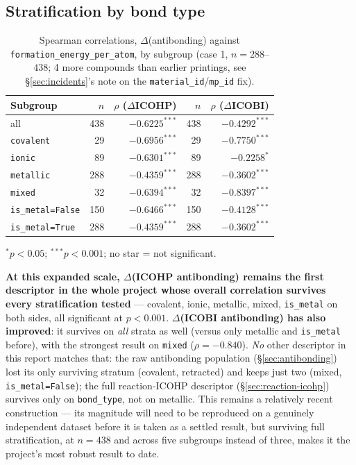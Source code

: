 \documentclass[11pt,a4paper]{article}
\begin{document}
\subsection{Stratification by bond type}

\begin{table}[htbp]
\centering
\caption{Spearman correlations, $\Delta$(antibonding) against \texttt{formation\_energy\_per\_atom}, by subgroup (case 1, $n=288$--$438$; 4 more compounds than earlier printings, see \S\ref{sec:incidents}'s note on the \texttt{material\_id}/\texttt{mp\_id} fix).}
\label{tab:delta-antibonding-stratified}
\begin{tabular}{@{}lrrrr@{}}
\toprule
Subgroup & $n$ & $\rho$ ($\Delta$ICOHP) & $n$ & $\rho$ ($\Delta$ICOBI) \\
\midrule
all                 & 438 & $-0.6225^{***}$ & 438 & $-0.4292^{***}$ \\
\texttt{covalent}   & 29  & $-0.6956^{***}$ & 29  & $-0.7750^{***}$ \\
\texttt{ionic}      & 89  & $-0.6301^{***}$ & 89  & $-0.2258^{*}$ \\
\texttt{metallic}   & 288 & $-0.4359^{***}$ & 288 & $-0.3602^{***}$ \\
\texttt{mixed}      & 32  & $-0.6394^{***}$ & 32  & $-0.8397^{***}$ \\
\texttt{is\_metal=False} & 150 & $-0.6466^{***}$ & 150 & $-0.4128^{***}$ \\
\texttt{is\_metal=True}  & 288 & $-0.4359^{***}$ & 288 & $-0.3602^{***}$ \\
\bottomrule
\end{tabular}

\vspace{0.15cm}
{\footnotesize $^{*}p<0.05$; $^{***}p<0.001$; no star = not
significant.}
\end{table}

\textbf{At this expanded scale, $\Delta$(ICOHP antibonding) remains the
first descriptor in the whole project whose overall correlation
survives every stratification tested} --- covalent, ionic, metallic,
mixed, \texttt{is\_metal} on both sides, all significant at
$p<0.001$. \textbf{$\Delta$(ICOBI antibonding) has also improved}: it
survives on \emph{all} strata as well (versus only metallic and
\texttt{is\_metal} before), with the strongest result on
\texttt{mixed} ($\rho=-0.840$). \emph{No} other descriptor in this
report matches that: the raw antibonding population
(\S\ref{sec:antibonding}) lost its only surviving stratum (covalent,
retracted) and keeps just two (mixed, \texttt{is\_metal=False}); the
full reaction-ICOHP descriptor (\S\ref{sec:reaction-icohp}) survives
only on \texttt{bond\_type}, not on metallic. This remains a
relatively recent construction --- its magnitude will need to be
reproduced on a genuinely independent dataset before it is taken as a
settled result, but surviving full stratification, at $n=438$ and
across five subgroups instead of three, makes it the project's most
robust result to date.
\end{document}
